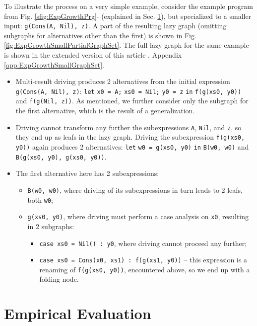\documentclass[submission,copyright,creativecommons]{eptcs}
\begin{document}
To illustrate the process on a very simple example, consider the example program from 
Fig. \ref{sfig:ExpGrowthPrg}- (explained in Sec. \ref{sec:EmpEval}), 
but specialized to a smaller input: \verb|g(Cons(A, Nil), z)|.
A part of the resulting lazy graph (omitting subgraphs for alternatives other than the first)
is shown in Fig. \ref{fig:ExpGrowthSmallPartialGraphSet}.
The full lazy graph for the same example is shown in 
\ifVptVer
the extended version of this article \cite{krustev2020controlling}.
\else
Appendix \ref{app:ExpGrowthSmallGraphSet}.
\fi
\begin{itemize}
  \item Multi-result driving produces 2 alternatives from the initial expression \verb|g(Cons(A, Nil), z)|:
    \verb|let| \verb|x0 = A;| \verb|xs0 = Nil;| \verb|y0 = z| \verb|in| \verb|f(g(xs0, y0))| and \verb|f(g(Nil, z))|.
    As mentioned, we further consider only the subgraph for the first alternative, which
    is the result of a generalization.
  \item Driving cannot transform any further the subexpressions \verb|A|, \verb|Nil|, and \verb|z|, 
    so they end up as leafs in the lazy graph.
    Driving the subexpression \verb|f(g(xs0, y0))| again produces 2 alternatives:
    \verb|let| \verb|w0 = g(xs0, y0)| \verb|in| \verb|B(w0, w0)| and \verb|B(g(xs0, y0), g(xs0, y0))|.
  \item The first alternative here has 2 subexpressions: 
    \begin{itemize}
      \item \verb|B(w0, w0)|, where driving of its subexpressions in turn leads to 2 leafs, both \verb|w0|;
      \item \verb|g(xs0, y0)|, where driving must perform a case analysis on \verb|x0|, resulting in 2 subgraphs:
      \begin{itemize}
        \item \verb|case xs0 = Nil() : y0|, where driving cannot proceed any further;
        \item \verb|case xs0 = Cons(x0, xs1) : f(g(xs1, y0))| -- this expression is a renaming of
          \verb|f(g(xs0, y0))|, encountered above, so we end up with a folding node.
      \end{itemize}
    \end{itemize}
\end{itemize}

\section{Empirical Evaluation}\label{sec:EmpEval}
\end{document}
